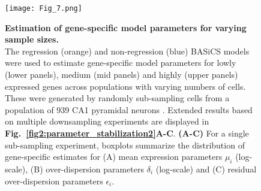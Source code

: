 \begin{figure}[!h]
\centering
\texttt{[image: Fig\_7.png]}
\caption[Estimation of gene-specific model parameters for varying sample sizes]{\textbf{Estimation of gene-specific model parameters for varying sample sizes.}\\
The regression (orange) and non-regression (blue) BASiCS models were used to estimate gene-specific model parameters for lowly (lower panels), medium (mid panels) and highly (upper panels) expressed genes across populations with varying numbers of cells. These were generated by randomly sub-sampling cells from a population of 939 CA1 pyramidal neurons \citep{Zeisel2015}. Extended results based on multiple downsampling experiments are displayed in \textbf{Fig.~\ref{fig2:parameter_stabilization2}A-C}. \textbf{(A-C)} For a single sub-sampling experiment, boxplots summarize the distribution of gene-specific estimates for (A) mean expression parameters $\mu_i$ (log-scale), (B) over-dispersion parameters $\delta_i$ (log-scale) and (C) residual over-dispersion parameters $\epsilon_i$.}
\label{fig2:parameter_stabilization}
\end{figure}

